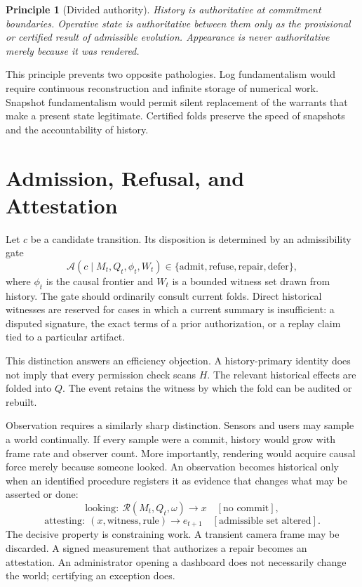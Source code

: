 \documentclass[11pt]{article}
\newtheorem{principle}{Principle}
\newcommand{\Render}{\mathcal{R}}
\newcommand{\Adm}{\mathcal{A}}
\begin{document}
\begin{principle}[Divided authority]
History is authoritative at commitment boundaries. Operative state is authoritative between them only as the provisional or certified result of admissible evolution. Appearance is never authoritative merely because it was rendered.
\end{principle}

This principle prevents two opposite pathologies. Log fundamentalism would require continuous reconstruction and infinite storage of numerical work. Snapshot fundamentalism would permit silent replacement of the warrants that make a present state legitimate. Certified folds preserve the speed of snapshots and the accountability of history.

\section{Admission, Refusal, and Attestation}

Let $c$ be a candidate transition. Its disposition is determined by an admissibility gate
\[
\Adm(c\mid M_t,Q_t,\phi_t,W_t)\in\{\mathrm{admit},\mathrm{refuse},\mathrm{repair},\mathrm{defer}\},
\]
where $\phi_t$ is the causal frontier and $W_t$ is a bounded witness set drawn from history. The gate should ordinarily consult current folds. Direct historical witnesses are reserved for cases in which a current summary is insufficient: a disputed signature, the exact terms of a prior authorization, or a replay claim tied to a particular artifact.

This distinction answers an efficiency objection. A history-primary identity does not imply that every permission check scans $H$. The relevant historical effects are folded into $Q$. The event retains the witness by which the fold can be audited or rebuilt.

Observation requires a similarly sharp distinction. Sensors and users may sample a world continually. If every sample were a commit, history would grow with frame rate and observer count. More importantly, rendering would acquire causal force merely because someone looked. An observation becomes historical only when an identified procedure registers it as evidence that changes what may be asserted or done:
\[
\text{looking}:\ \Render(M_t,Q_t,\omega)\to x \quad [\text{no commit}],
\]
\[
\text{attesting}:\ (x,\text{witness},\text{rule})\to e_{t+1}\quad [\text{admissible set altered}].
\]
The decisive property is constraining work. A transient camera frame may be discarded. A signed measurement that authorizes a repair becomes an attestation. An administrator opening a dashboard does not necessarily change the world; certifying an exception does.
\end{document}
